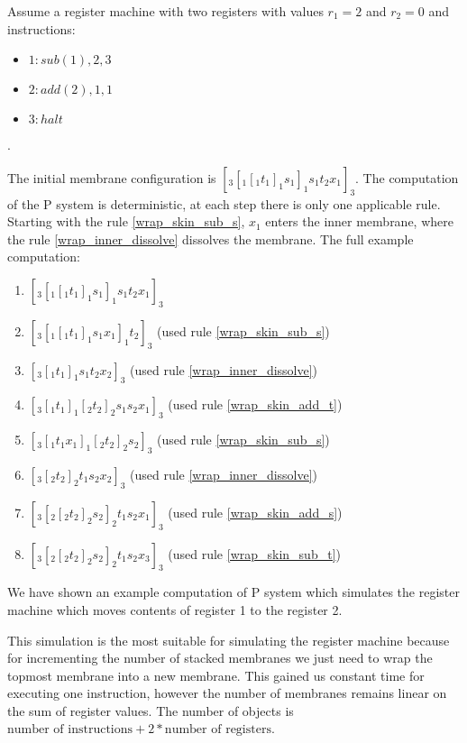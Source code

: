     \begin{example}
      Assume a register machine with two registers with values $r_1=2$ and $r_2=0$ and instructions:
      \begin{itemize}
        \item $1: sub(1),2,3$
        \item $2: add(2),1,1$
        \item $3: halt$
      \end{itemize}.

      The initial membrane configuration is $[_3 [_1 [_1 t_1 ]_1 s_1 ]_1 s_1 t_2 x_1 ]_3$. The computation of the P system is deterministic, at each step there is only one applicable rule. Starting with the rule \ref{wrap_skin_sub_s}, $x_1$ enters the inner membrane, where the rule \ref{wrap_inner_dissolve} dissolves the membrane. The full example computation:

      \begin{enumerate}
        \item $[_3 [_1 [_1 t_1 ]_1 s_1 ]_1 s_1 t_2 x_1 ]_3$
        \item $[_3 [_1 [_1 t_1 ]_1 s_1 x_1 ]_1 t_2 ]_3$ (used rule \ref{wrap_skin_sub_s})
        \item $[_3 [_1 t_1 ]_1 s_1 t_2 x_2 ]_3$ (used rule \ref{wrap_inner_dissolve})
        \item $[_3 [_1 t_1 ]_1 [_2 t_2 ]_2 s_1 s_2 x_1 ]_3$ (used rule \ref{wrap_skin_add_t})
        \item $[_3 [_1 t_1 x_1 ]_1 [_2 t_2 ]_2 s_2 ]_3$ (used rule \ref{wrap_skin_sub_s})
        \item $[_3 [_2 t_2 ]_2 t_1 s_2 x_2 ]_3$ (used rule \ref{wrap_inner_dissolve})
        \item $[_3 [_2 [_2 t_2 ]_2 s_2 ]_2 t_1 s_2 x_1 ]_3$ (used rule \ref{wrap_skin_add_s})
        \item $[_3 [_2 [_2 t_2 ]_2 s_2 ]_2 t_1 s_2 x_3 ]_3$ (used rule \ref{wrap_skin_sub_t})
      \end{enumerate}

      We have shown an example computation of P system which simulates the register machine which moves contents of register 1 to the register 2.
    \end{example}

    This simulation is the most suitable for simulating the register machine because for incrementing the number of stacked membranes we just need to wrap the topmost membrane into a new membrane. This gained us constant time for executing one instruction, however the number of membranes remains linear on the sum of register values. The number of objects is $\text{number of instructions} + 2 * \text{number of registers}$.

